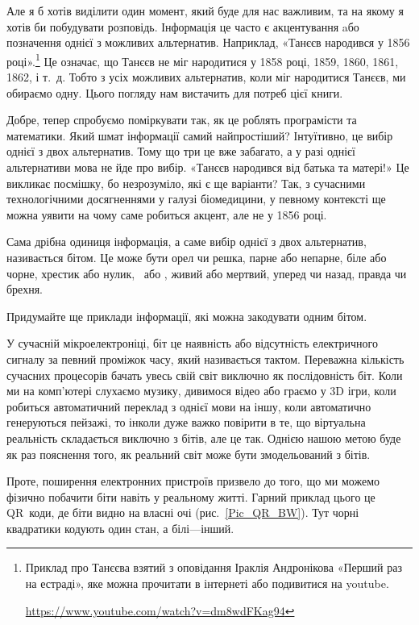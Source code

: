Але я б хотів виділити один момент, який буде для нас важливим, та на якому я хотів би побудувати розповідь.
Інформація це часто є акцентування aбо позначення однієї з можливих альтернатив.
Наприклад, «Танєєв народився у 1856 році».\footnote{
  Приклад про Танєєва взятий з оповідання Іраклія Андронікова «Перший раз на естраді», яке можна прочитати в інтернеті або подивитися на youtube.
  \par\url{https://www.youtube.com/watch?v=dm8wdFKag94}}
Це означає, що Танєєв не міг народитися у 1858 році, 1859, 1860, 1861, 1862, і т.~д.
Тобто з усіх можливих альтернатив, коли міг народитися Танєєв, ми обираємо одну.
Цього погляду нам вистачить для потреб цієї книги.

Добре, тепер спробуємо поміркувати так, як це роблять програмісти та математики.
Який шмат інформації самий найпростіший?
Інтуїтивно, це вибір однієї з двох альтернатив.
Тому що три це вже забагато, а у разі однієї альтернативи мова не йде про вибір.
«Танєєв народився від батька та матері!»
Це викликає посмішку, бо незрозуміло, які є ще варіанти?
Так, з сучасними технологічними досягненнями у галузі біомедицини, у певному контексті ще можна уявити на чому саме робиться акцент, але не у 1856 році.

Сама дрібна одиниця інформація, а саме вибір однієї з двох альтернатив, називається бітом. 
Це може бути орел чи решка, парне або непарне, біле або чорне, хрестик або нулик, \Male\ або \Female, живий або мертвий, уперед чи назад, правда чи брехня.

\begin{exercise}
Придумайте ще приклади інформації, які можна закодувати одним бітом.
\end{exercise}

У сучасній мікроелектроніці, біт це наявність або відсутність електричного сигналу за певний проміжок часу, який називається тактом. 
Переважна кількість сучасних процесорів бачать увесь свій світ виключно як послідовність біт.
Коли ми на комп'ютері слухаємо музику, дивимося відео або граємо у 3D ігри, коли робиться автоматичний переклад з однієї мови на іншу, коли автоматично генеруються пейзажі, то інколи дуже важко повірити в те, що віртуальна реальність складається виключно з бітів, але це так.
Однією нашою метою буде як раз пояснення того, як реальний світ може бути змодельований з бітів.

Проте, поширення електронних пристроїв призвело до того, що ми можемо фізично побачити біти навіть у реальному житті.
Гарний приклад цього це QR~коди, де біти видно на власні очі (рис.~\ref{Pic_QR_BW}).
Тут чорні квадратики кодують один стан, а білі---інший.

